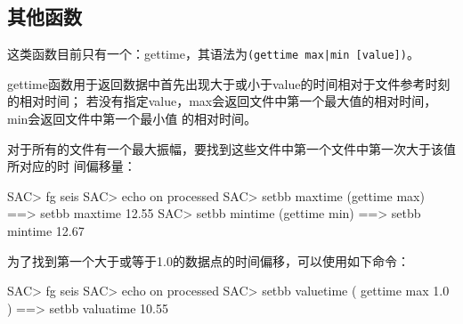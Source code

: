 \subsection{其他函数}
这类函数目前只有一个：gettime，其语法为\lstinline'(gettime max|min [value])'。

gettime函数用于返回数据中首先出现大于或小于value的时间相对于文件参考时刻的相对时间；
若没有指定value，max会返回文件中第一个最大值的相对时间，min会返回文件中第一个最小值
的相对时间。

对于所有的文件有一个最大振幅，要找到这些文件中第一个文件中第一次大于该值所对应的时
间偏移量：
\begin{SACCode}
SAC> fg seis
SAC> echo on processed
SAC> setbb maxtime (gettime max)
 ==>  setbb maxtime 12.55
SAC> setbb mintime (gettime min)
 ==>  setbb mintime 12.67
\end{SACCode}

为了找到第一个大于或等于1.0的数据点的时间偏移，可以使用如下命令：
\begin{SACCode}
SAC> fg seis
SAC> echo on processed
SAC> setbb valuetime ( gettime max 1.0 )
 ==> setbb valuatime 10.55
\end{SACCode}

